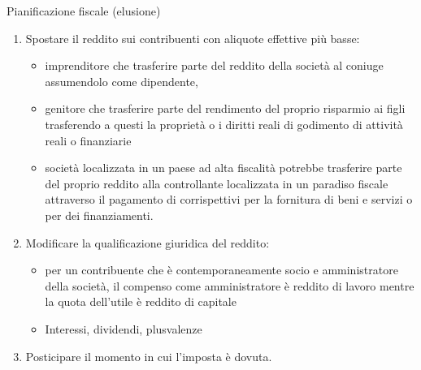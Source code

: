 \documentclass[aspectratio=64,11pt]{beamer}
\begin{document}
\begin{frame}{Pianificazione fiscale (elusione)}
\begin{enumerate}
\item Spostare il reddito sui contribuenti con aliquote effettive più basse:  
\begin{itemize}
\item imprenditore che trasferire parte del reddito della società al coniuge
assumendolo come dipendente,
\item genitore che trasferire parte del rendimento del proprio risparmio ai
figli trasferendo a questi la proprietà o i diritti reali di godimento di
attività reali o finanziarie
\item società localizzata in un paese ad alta fiscalità potrebbe trasferire
parte del proprio reddito alla controllante localizzata in un paradiso
fiscale attraverso il pagamento di corrispettivi per la fornitura di beni
e servizi o per dei finanziamenti.
\end{itemize}
\item Modificare la qualificazione giuridica del reddito:
\begin{itemize}
\item per un contribuente che è contemporaneamente socio e amministratore della
società, il compenso come amministratore è reddito di lavoro mentre la
quota dell’utile è reddito di capitale
\item Interessi, dividendi, plusvalenze
\end{itemize}
\item Posticipare il momento in cui l’imposta è dovuta.
\end{enumerate}
\end{frame}
\end{document}
